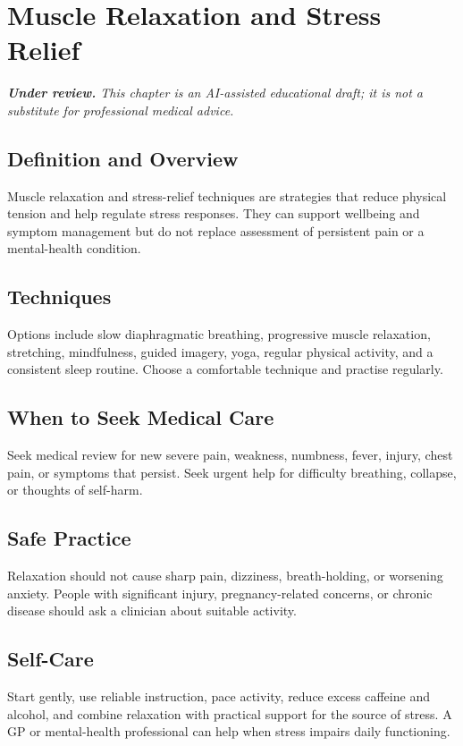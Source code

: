 \chapter{Muscle Relaxation and Stress Relief}

\medskip
\noindent\textit{\textbf{Under review.} This chapter is an AI-assisted educational draft; it is not a substitute for professional medical advice.}

\section*{Definition and Overview}
Muscle relaxation and stress-relief techniques are strategies that reduce physical tension and help regulate stress responses. They can support wellbeing and symptom management but do not replace assessment of persistent pain or a mental-health condition.

\section*{Techniques}
Options include slow diaphragmatic breathing, progressive muscle relaxation, stretching, mindfulness, guided imagery, yoga, regular physical activity, and a consistent sleep routine. Choose a comfortable technique and practise regularly.

\section*{When to Seek Medical Care}
Seek medical review for new severe pain, weakness, numbness, fever, injury, chest pain, or symptoms that persist. Seek urgent help for difficulty breathing, collapse, or thoughts of self-harm.

\section*{Safe Practice}
Relaxation should not cause sharp pain, dizziness, breath-holding, or worsening anxiety. People with significant injury, pregnancy-related concerns, or chronic disease should ask a clinician about suitable activity.

\section*{Self-Care}
Start gently, use reliable instruction, pace activity, reduce excess caffeine and alcohol, and combine relaxation with practical support for the source of stress. A GP or mental-health professional can help when stress impairs daily functioning.


